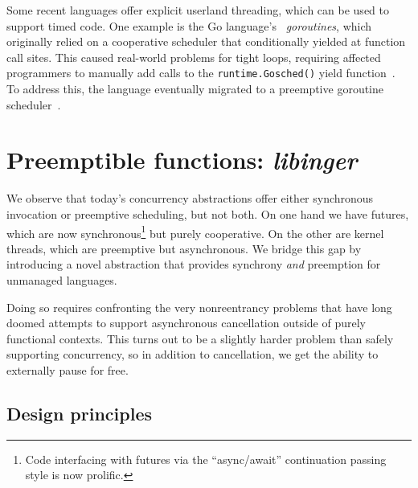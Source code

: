 \begin{swallowsections}
\begin{swallowfigures}

\end{swallowfigures}
\end{swallowsections}




Some recent languages offer explicit userland threading, which can be used to
support timed code.  One example is the Go language's~\cite{www-golang}
\textit{goroutines}, which originally relied on a cooperative scheduler that
conditionally yielded at function call sites.  This caused real-world problems for
tight loops, requiring affected programmers to manually add calls to the
\texttt{runtime.Gosched()} yield function~\cite{www-golang-tightloop}.  To address
this, the language eventually migrated to a preemptive goroutine
scheduler~\cite{www-golang-rel14notes}.




\section{Preemptible functions: \textit{libinger}}

We observe that today's concurrency abstractions offer either synchronous invocation
or preemptive scheduling, but not both.  On one hand we have futures, which are now
synchronous\footnote{Code interfacing with futures via the ``async/await''
continuation passing style is now prolific.} but purely cooperative.  On the other
are kernel threads, which are preemptive but asynchronous.  We bridge this gap by
introducing a novel abstraction that provides synchrony \textit{and} preemption for
unmanaged languages.

Doing so requires confronting the very nonreentrancy problems that have long doomed
attempts to support asynchronous cancellation outside of purely functional contexts.
This turns out to be a slightly harder problem than safely supporting concurrency, so
in addition to cancellation, we get the ability to externally pause for free.

\begin{swallowsections}

\end{swallowsections}


\subsection{Design principles}

